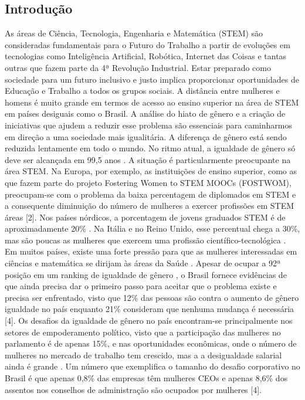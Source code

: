 \subsection{Introdução}

As áreas de Ciência, Tecnologia, Engenharia e Matemática (STEM) são consideradas fundamentais para o Futuro do Trabalho a partir de evoluções em tecnologias como Inteligência Artificial, Robótica, Internet das Coisas e tantas outras que fazem parte da 4ª Revolução Industrial. Estar preparado como sociedade para um futuro inclusivo e justo implica proporcionar oportunidades de Educação e Trabalho a todos os grupos sociais. A distância entre mulheres e homens é muito grande em termos de acesso ao ensino superior na área de STEM em países desiguais como o Brasil. A análise do hiato de gênero e a criação de iniciativas que ajudem a reduzir esse problema são essenciais para caminharmos em direção a uma sociedade mais igualitária. A diferença de gênero está sendo reduzida lentamente em todo o mundo. No ritmo atual, a igualdade de gênero só deve ser alcançada em 99,5 anos \citep{schwab_global_2019}. A situação é particularmente preocupante na área STEM. Na Europa, por exemplo, as instituições de ensino superior, como as que fazem parte do projeto Fostering Women to STEM MOOCs (FOSTWOM), preocupam-se com o problema da baixa percentagem de diplomados em STEM e a consequente diminuição do número de mulheres a exercer profissões em STEM áreas [2]. Nos países nórdicos, a porcentagem de jovens graduados STEM é de aproximadamente 20\% \citep{noauthor_2018_nodate}. Na Itália e no Reino Unido, esse percentual chega a 30\%, mas são poucas as mulheres que exercem uma profissão científico-tecnológica \citep{noauthor_2018_nodate}. Em muitos países, existe uma forte pressão para que as mulheres interessadas em ciências e matemática se dirijam às áreas da Saúde \citep{noauthor_2018_nodate}. Apesar de ocupar a 92ª posição em um ranking de igualdade de gênero \citep{schwab_global_2019}, o Brasil fornece evidências de que ainda precisa dar o primeiro passo para aceitar que o problema existe e precisa ser enfrentado, visto que 12\% das pessoas são contra o aumento de gênero igualdade no país enquanto 21\% consideram que nenhuma mudança é necessária [4]. Os desafios da igualdade de gênero no país encontram-se principalmente nos setores de empoderamento político, visto que a participação das mulheres no parlamento é de apenas 15\%, e nas oportunidades econômicas, onde o número de mulheres no mercado de trabalho tem crescido, mas a a desigualdade salarial ainda é grande \citep{schwab_global_2019}. Um número que exemplifica o tamanho do desafio corporativo no Brasil é que apenas 0,8\% das empresas têm mulheres CEOs e apenas 8,6\% dos assentos nos conselhos de administração são ocupados por mulheres [4].

